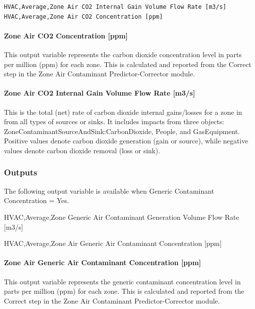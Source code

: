 \begin{lstlisting}
HVAC,Average,Zone Air CO2 Internal Gain Volume Flow Rate [m3/s]
HVAC,Average,Zone Air CO2 Concentration [ppm]
\end{lstlisting}

\paragraph{Zone Air CO2 Concentration {[}ppm{]}}\label{zone-air-co2-concentration-ppm}

This output variable represents the carbon dioxide concentration level in parts per million (ppm) for each zone. This is calculated and reported from the Correct step in the Zone Air Contaminant Predictor-Corrector module.

\paragraph{Zone Air CO2 Internal Gain Volume Flow Rate {[}m3/s{]}}\label{zone-air-co2-internal-gain-volume-flow-rate-m3s}

This is the total (net) rate of carbon dioxide internal gains/losses for a zone in \si{\volumeFlowRate} from all types of sources or sinks. It includes impacts from three objects: ZoneContaminantSourceAndSink:CarbonDioxide, People, and GasEquipment. Positive values denote carbon dioxide generation (gain or source), while negative values denote carbon dioxide removal (loss or sink).

\subsubsection{Outputs}\label{outputs-1-024}

The following output variable is available when Generic Contaminant Concentration = Yes.

HVAC,Average,Zone Generic Air Contaminant Generation Volume Flow Rate {[}m3/s{]}

HVAC,Average,Zone Air Generic Air Contaminant Concentration {[}ppm{]}

\paragraph{Zone Air Generic Air Contaminant Concentration {[}ppm{]}}\label{zone-air-generic-air-contaminant-concentration-ppm}

This output variable represents the generic contaminant concentration level in parts per million (ppm) for each zone. This is calculated and reported from the Correct step in the Zone Air Contaminant Predictor-Corrector module.

